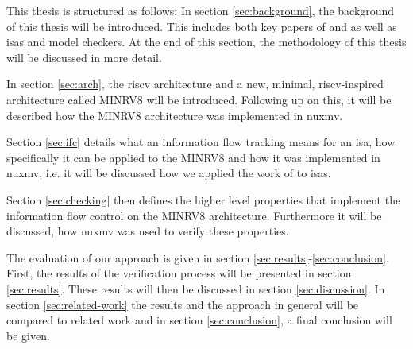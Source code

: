 This thesis is structured as follows:
In section \ref{sec:background}, the background of this thesis will be introduced.
This includes both key papers of \citeauthor{Reid17} and \citeauthor{Ferraiuolo17} as well as \glspl{isa} and model checkers.
At the end of this section, the methodology of this thesis will be discussed in more detail.

In section \ref{sec:arch}, the \gls{riscv} architecture and a new, minimal, \gls{riscv}-inspired architecture called MINRV8 will be introduced.
Following up on this, it will be described how the MINRV8 architecture was implemented in \gls{nuxmv}.

Section \ref{sec:ifc} details what an information flow tracking means for an \gls{isa}, how specifically it can be applied to the MINRV8 and how it was implemented in \gls{nuxmv}, i.e. it will be discussed how we applied the work of \citeauthor{Ferraiuolo17} \cite{Ferraiuolo17} to \glspl{isa}.

Section \ref{sec:checking} then defines the higher level properties that implement the information flow control on the MINRV8 architecture.
Furthermore it will be discussed, how \gls{nuxmv} was used to verify these properties.

The evaluation of our approach is given in section \ref{sec:results}-\ref{sec:conclusion}.
First, the results of the verification process will be presented in section \ref{sec:results}.
These results will then be discussed in section \ref{sec:discussion}.
In section \ref{sec:related-work} the results and the approach in general will be compared to related work and in section \ref{sec:conclusion}, a final conclusion will be given.

